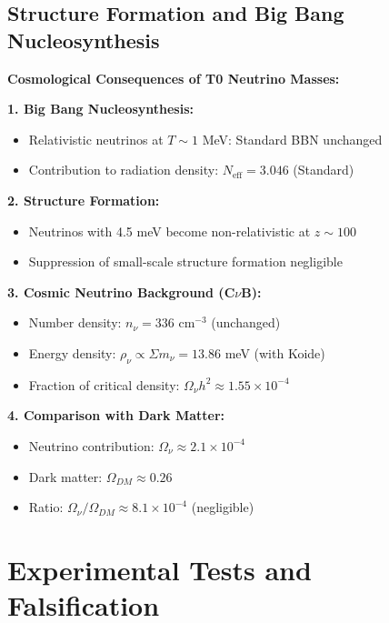 	\subsection{Structure Formation and Big Bang Nucleosynthesis}
	
	\begin{keyresult}
		\textbf{Cosmological Consequences of T0 Neutrino Masses:}
		
		\textbf{1. Big Bang Nucleosynthesis:}
		\begin{itemize}
			\item Relativistic neutrinos at $T \sim 1$ MeV: Standard BBN unchanged
			\item Contribution to radiation density: $N_{\text{eff}} = 3.046$ (Standard)
		\end{itemize}
		
		\textbf{2. Structure Formation:}
		\begin{itemize}
			\item Neutrinos with 4.5 meV become non-relativistic at $z \sim 100$
			\item Suppression of small-scale structure formation negligible
		\end{itemize}
		
		\textbf{3. Cosmic Neutrino Background (C$\nu$B):}
		\begin{itemize}
			\item Number density: $n_\nu = 336$ cm$^{-3}$ (unchanged)
			\item Energy density: $\rho_\nu \propto \Sigma m_\nu = 13.86$ meV (with Koide)
			\item Fraction of critical density: $\Omega_\nu h^2 \approx 1.55 \times 10^{-4}$
		\end{itemize}
		
		\textbf{4. Comparison with Dark Matter:}
		\begin{itemize}
			\item Neutrino contribution: $\Omega_\nu \approx 2.1 \times 10^{-4}$
			\item Dark matter: $\Omega_{DM} \approx 0.26$
			\item Ratio: $\Omega_\nu/\Omega_{DM} \approx 8.1 \times 10^{-4}$ (negligible)
		\end{itemize}
	\end{keyresult}
	
	\section{Experimental Tests and Falsification}
	
